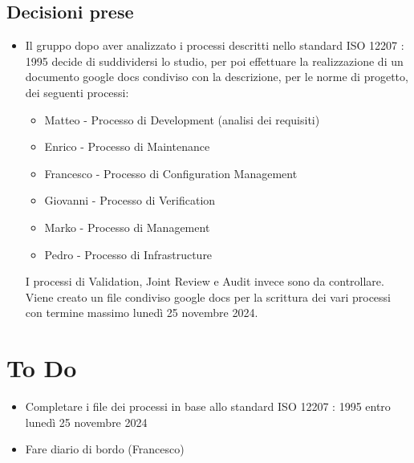 \documentclass[a4paper, 12pt]{article}
\begin{document}
\subsection{Decisioni prese}
\begin{itemize}
    \item Il gruppo dopo aver analizzato i processi descritti nello standard ISO 12207 : 1995 decide di suddividersi lo studio, per poi effettuare la realizzazione di un documento google docs condiviso con la descrizione, per le norme di progetto, dei seguenti processi:
    \begin{itemize}
        \item Matteo - Processo di Development (analisi dei requisiti)
        \item Enrico - Processo di Maintenance
        \item Francesco - Processo di Configuration Management
        \item Giovanni - Processo di Verification
        \item Marko - Processo di Management
        \item Pedro - Processo di Infrastructure
    \end{itemize}
    I processi di Validation, Joint Review e Audit invece sono da controllare.
    Viene creato un file condiviso google docs per la scrittura dei vari processi con termine massimo lunedì 25 novembre 2024.
\end{itemize}

\section{To Do}
    \begin{itemize}
        \item Completare i file dei processi in base allo standard ISO 12207 : 1995 entro lunedì 25 novembre 2024
        \item Fare diario di bordo (Francesco)
    \end{itemize}
\end{document}
